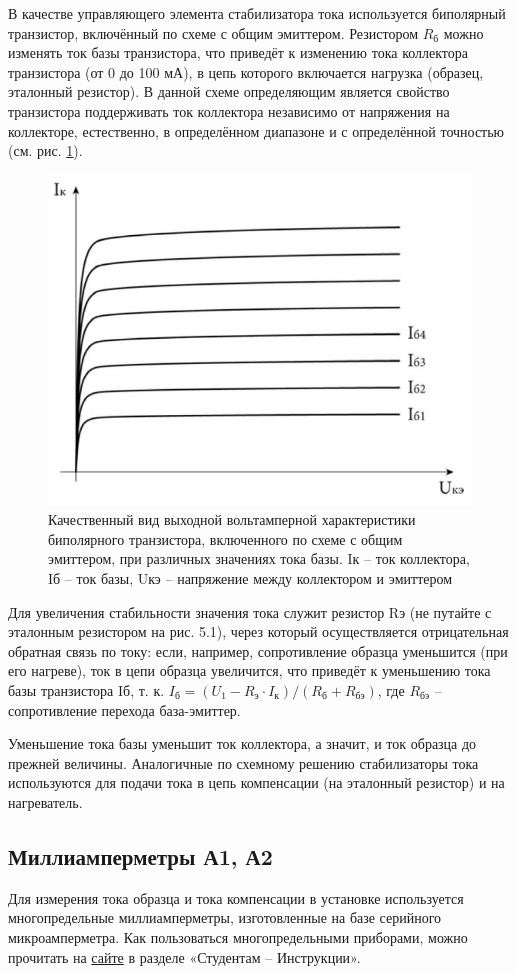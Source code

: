 В качестве управляющего элемента стабилизатора тока используется биполярный транзистор, включённый по схеме с общим
эмиттером. Резистором $R_\text{б}$ можно изменять ток базы транзистора, что приведёт к изменению тока коллектора
транзистора (от 0 до 100 мА), в цепь которого включается нагрузка (образец, эталонный резистор). В данной схеме
определяющим является свойство транзистора поддерживать ток коллектора независимо от напряжения на коллекторе,
естественно, в определённом диапазоне и с определённой точностью (см. рис. \ref{fig:6.4}).
\begin{figure}[h!]
	\centering
	\includegraphics[width = .5\linewidth]{img/61.jpg}
	\caption{Качественный вид выходной вольтамперной характеристики биполярного транзистора, включенного по схеме с
	общим эмиттером, при различных значениях тока базы. Iк – ток коллектора, Iб – ток базы, Uкэ – напряжение между коллектором и эмиттером}
	\label{fig:6.4}
\end{figure}
 Для увеличения стабильности значения тока служит резистор Rэ (не путайте с эталонным резистором на рис. 5.1), через
 который осуществляется отрицательная обратная связь по току: если, например, сопротивление образца уменьшится (при его
 нагреве), ток в цепи образца увеличится, что приведёт к уменьшению тока базы транзистора Iб, т. к.
$I_\text{б} = (U_1 - R_\text{э} \cdot I_\text{к}) / (R_\text{б} + R_\text{бэ})$, где $R_\text{бэ}$ – сопротивление перехода база-эмиттер.

Уменьшение тока базы уменьшит ток коллектора, а значит, и ток образца до прежней величины.
Аналогичные по схемному решению стабилизаторы тока используются для подачи тока в цепь компенсации (на эталонный
резистор) и на нагреватель.

\subsection{Миллиамперметры А1, А2}
Для измерения тока образца и тока компенсации в установке используется многопредельные миллиамперметры, изготовленные на
базе серийного микроамперметра. Как пользоваться многопредельными приборами, можно прочитать на
\href{http://www.rf.unn.ru/eledep/}{сайте} в разделе «Студентам – Инструкции».

